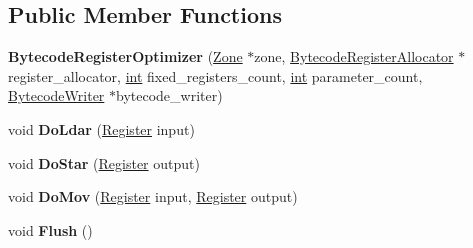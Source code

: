 \subsection*{Public Member Functions}
\begin{DoxyCompactItemize}
\item 
\mbox{\label{classv8_1_1internal_1_1interpreter_1_1BytecodeRegisterOptimizer_aea99a7bb39a35d487de4d60f422ce14a}} 
{\bfseries Bytecode\+Register\+Optimizer} (\mbox{\hyperlink{classv8_1_1internal_1_1Zone}{Zone}} $\ast$zone, \mbox{\hyperlink{classv8_1_1internal_1_1interpreter_1_1BytecodeRegisterAllocator}{Bytecode\+Register\+Allocator}} $\ast$register\+\_\+allocator, \mbox{\hyperlink{classint}{int}} fixed\+\_\+registers\+\_\+count, \mbox{\hyperlink{classint}{int}} parameter\+\_\+count, \mbox{\hyperlink{classv8_1_1internal_1_1interpreter_1_1BytecodeRegisterOptimizer_1_1BytecodeWriter}{Bytecode\+Writer}} $\ast$bytecode\+\_\+writer)
\item 
\mbox{\label{classv8_1_1internal_1_1interpreter_1_1BytecodeRegisterOptimizer_a92fd27975a6ddd1b89b09e84a0462864}} 
void {\bfseries Do\+Ldar} (\mbox{\hyperlink{classv8_1_1internal_1_1interpreter_1_1Register}{Register}} input)
\item 
\mbox{\label{classv8_1_1internal_1_1interpreter_1_1BytecodeRegisterOptimizer_aa0177340a164002087636d07325defe2}} 
void {\bfseries Do\+Star} (\mbox{\hyperlink{classv8_1_1internal_1_1interpreter_1_1Register}{Register}} output)
\item 
\mbox{\label{classv8_1_1internal_1_1interpreter_1_1BytecodeRegisterOptimizer_aa8d192275e0aa0cee25eb29f0d781200}} 
void {\bfseries Do\+Mov} (\mbox{\hyperlink{classv8_1_1internal_1_1interpreter_1_1Register}{Register}} input, \mbox{\hyperlink{classv8_1_1internal_1_1interpreter_1_1Register}{Register}} output)
\item 
\mbox{\label{classv8_1_1internal_1_1interpreter_1_1BytecodeRegisterOptimizer_ac8008a00c9b1925c724cbc58098811d9}} 
void {\bfseries Flush} ()
\item 

\end{DoxyCompactItemize}
